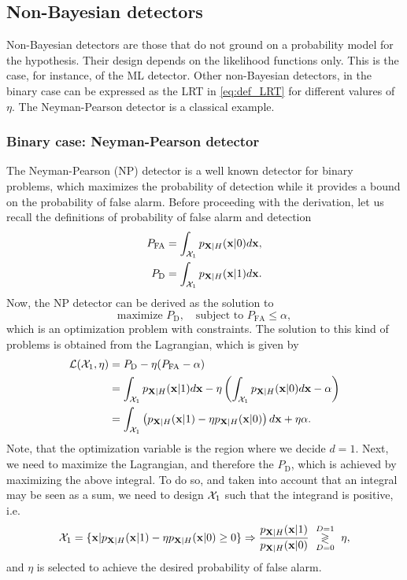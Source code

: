 \subsection{Non-Bayesian detectors}

Non-Bayesian detectors are those that do not ground on a probability model for the hypothesis. Their design depends on the likelihood functions only. This is the case, for instance, of the ML detector. Other non-Bayesian detectors, in the binary case can be expressed as the LRT in \eqref{eq:def_LRT} for different valures of $\eta$. The Neyman-Pearson detector is a classical example.


\subsubsection{Binary case: Neyman-Pearson detector}

The Neyman-Pearson (NP) detector is a well known detector for binary problems, which maximizes the probability of detection while it provides a bound on the probability of false alarm. Before proceeding with the derivation, let us recall the definitions of probability of false alarm and detection
\begin{align}
P_\text{FA} & = \int_{{\cal X}_1} p_{{\bf X}|H}({\bf x}|0) d{\bf x}, \nonumber \\
P_\text{D} & = \int_{{\cal X}_1} p_{{\bf X}|H}({\bf x}|1) d{\bf x}. \nonumber
\end{align}
Now, the NP detector can be derived as the solution to
\begin{equation*}
	\text{maximize } P_\text{D}, \quad \text{subject to } P_\text{FA} \le \alpha,
\end{equation*}
which is an optimization problem with constraints. The solution to this kind of problems is obtained from the Lagrangian, which is given by
\begin{align}
\mathcal{L}(\mathcal{X}_1,\eta) &= P_\text{D} - \eta (P_\text{FA} - \alpha) \nonumber \\
	&= \int_{{\cal X}_1} p_{{\bf X}|H}({\bf x}|1) d{\bf x}  - \eta \left(\int_{{\cal X}_1} 
	                     p_{{\bf X}|H}({\bf x}|0) d{\bf x} - \alpha \right) \nonumber \\
	&= \int_{\mathcal{X}_1} 
			\left( p_{{\bf X}|H}({\bf x}|1) - \eta p_{{\bf X}|H}({\bf x}|0) \right) d{\bf x} 
	   + \eta \alpha. \nonumber
\end{align}
Note, that the optimization variable is the region where we decide $d=1$. Next, we need to maximize the Lagrangian, and therefore the $P_\text{D}$, which is achieved by maximizing the above integral. To do so, and taken into account that an integral may be seen as a sum, we need to design ${\cal X}_1$ such that the integrand is positive, i.e.
\begin{equation*}
\mathcal{X}_1 
	= \{\mathbf{x} |p_{{\bf X}|H}({\bf x}|1) - \eta p_{{\bf X}|H}({\bf x}|0) \geq 0 \} 
	     \Rightarrow \frac{p_{{\bf X}|H}({\bf x}|1)}{p_{{\bf X}|H}({\bf x}|0)} 
	     \,\, \underset{D=0}{\overset{D=1}{\gtrless}}\,\, \eta,
\end{equation*}
and $\eta$ is selected to achieve the desired probability of false alarm.

